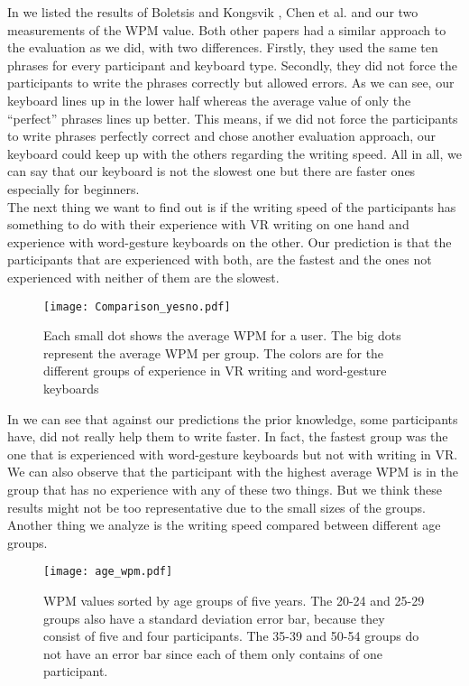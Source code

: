 In  we listed the results of Boletsis and Kongsvik \cite{Boletsis2019ControllerbasedTT}, Chen et al. \cite{10.1145/3290607.3312762} and our two measurements of the WPM value. Both other papers had a similar approach to the evaluation as we did, with two differences. Firstly, they used the same ten phrases for every participant and keyboard type. Secondly, they did not force the participants to write the phrases correctly but allowed errors. As we can see, our keyboard lines up in the lower half whereas the average value of only the ``perfect'' phrases lines up better. This means, if we did not force the participants to write phrases perfectly correct and chose another evaluation approach, our keyboard could keep up with the others regarding the writing speed. All in all, we can say that our keyboard is not the slowest one but there are faster ones especially for beginners.\\

The next thing we want to find out is if the writing speed of the participants has something to do with their experience with VR writing on one hand and experience with word-gesture keyboards on the other. Our prediction is that the participants that are experienced with both, are the fastest and the ones not experienced with neither of them are the slowest.\\
\vspace{-1.8em}
\begin{figure}[H]
    \centering
    \texttt{[image: Comparison\_yesno.pdf]}
    \vspace{-2em}
    \caption{Each small dot shows the average WPM for a user. The big dots represent the average WPM per group. The colors are for the different groups of experience in VR writing and word-gesture keyboards}
    \label{fig:WPM_yesno}
\end{figure}
In  we can see that against our predictions the prior knowledge, some participants have, did not really help them to write faster. In fact, the fastest group was the one that is experienced with word-gesture keyboards but not with writing in VR. We can also observe that the participant with the highest average WPM is in the group that has no experience with any of these two things. But we think these results might not be too representative due to the small sizes of the groups.\\

Another thing we analyze is the writing speed compared between different age groups.
\begin{figure}[H]
    \centering
    \texttt{[image: age\_wpm.pdf]}
    \caption{WPM values sorted by age groups of five years. The 20-24 and 25-29 groups also have a standard deviation error bar, because they consist of five and four participants. The 35-39 and 50-54 groups do not have an error bar since each of them only contains of one participant.}
    \label{fig:WPM_age}
\end{figure}

